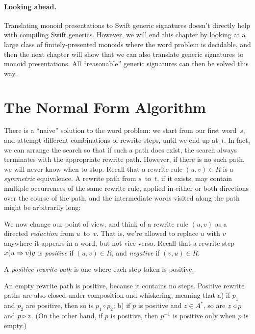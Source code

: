 \documentclass[../generics]{subfiles}
\begin{document}
\paragraph{Looking ahead.} Translating monoid presentations to Swift generic signatures doesn't directly help with compiling Swift generics. However, we will end this chapter by looking at a large class of finitely-presented monoids where the word problem is decidable, and then the next chapter will show that we can also translate generic signatures to monoid presentations. All ``reasonable'' generic signatures can then be solved this way.

\section{The Normal Form Algorithm}\label{sec:normal form algorithm}

There is a ``naive'' solution to the word problem: we start from our first word~$s$, and attempt different combinations of rewrite steps, until we end up at~$t$. In fact, we can arrange the search so that if such a path does exist, the search always terminates with the appropriate rewrite path. However, if there is no such path, we will never know when to stop. Recall that a rewrite rule $(u, v)\in R$ is a \emph{symmetric} equivalence. A rewrite path from $s$~to~$t$, if it exists, may contain multiple occurrences of the same rewrite rule, applied in either or both directions over the course of the path, and the intermediate words visited along the path might be arbitrarily long:
\begin{center}
\end{center}

We now change our point of view, and think of a rewrite rule $(u,v)$ as a directed \emph{reduction} from $u$~to~$v$. That is, we're allowed to replace $u$ with $v$ anywhere it appears in a word, but not vice versa. Recall that a rewrite step $x(u\Rightarrow v)y$ is \emph{positive} if $(u,v)\in R$, and \emph{negative} if $(v,u)\in R$.

\begin{definition}
A \emph{positive rewrite path} is one where each step taken is positive.
\end{definition}
An empty rewrite path is positive, because it contains no steps. Positive rewrite paths are also closed under composition and whiskering, meaning that a) if $p_1$ and $p_2$ are positive, then so is $p_1\circ p_2$; b) if $p$ is positive and $z\in A^*$, so are $z\triangleleft p$ and $p\triangleright z$. (On the other hand, if $p$ is positive, then $p^{-1}$ is positive only when $p$ is empty.)
\end{document}
